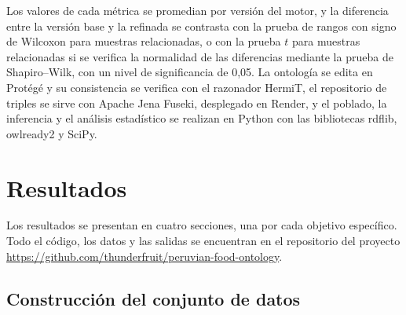 \documentclass[conference]{IEEEtran}
\begin{document}
Los valores de cada métrica se promedian por versión del motor, y la diferencia entre la versión base y la refinada se contrasta con la prueba de rangos con signo de Wilcoxon para muestras relacionadas, o con la prueba $t$ para muestras relacionadas si se verifica la normalidad de las diferencias mediante la prueba de Shapiro--Wilk, con un nivel de significancia de 0,05. La ontología se edita en Protégé y su consistencia se verifica con el razonador HermiT, el repositorio de triples se sirve con Apache Jena Fuseki, desplegado en Render, y el poblado, la inferencia y el análisis estadístico se realizan en Python con las bibliotecas rdflib, owlready2 y SciPy.

\section{Resultados}

Los resultados se presentan en cuatro secciones, una por cada objetivo específico. Todo el código, los datos y las salidas se encuentran en el repositorio del proyecto \url{https://github.com/thunderfruit/peruvian-food-ontology}.

\subsection{Construcción del conjunto de datos}
\end{document}
